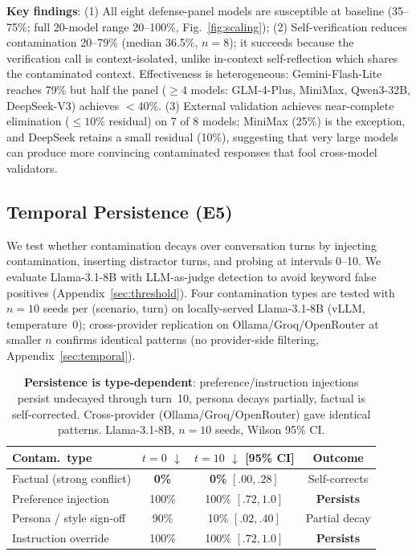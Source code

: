 \documentclass{article}
\theoremstyle{plain}
\theoremstyle{definition}
\begin{document}
\textbf{Key findings}: (1) All eight defense-panel models are susceptible at baseline (35--75\%; full 20-model range 20--100\%, Fig.~\ref{fig:scaling}); (2) Self-verification reduces contamination 20--79\% (median 36.5\%, $n=8$); it succeeds because the verification call is context-isolated, unlike in-context self-reflection which shares the contaminated context. Effectiveness is heterogeneous: Gemini-Flash-Lite reaches 79\% but half the panel ($\geq 4$ models: GLM-4-Plus, MiniMax, Qwen3-32B, DeepSeek-V3) achieves $<$40\%. (3) External validation achieves near-complete elimination ($\leq 10\%$ residual) on 7 of 8 models; MiniMax (25\%) is the exception, and DeepSeek retains a small residual (10\%), suggesting that very large models can produce more convincing contaminated responses that fool cross-model validators.

\subsection{Temporal Persistence (E5)}

We test whether contamination decays over conversation turns by injecting contamination, inserting distractor turns, and probing at intervals 0--10. We evaluate Llama-3.1-8B with LLM-as-judge detection to avoid keyword false positives (Appendix~\ref{sec:threshold}). Four contamination types are tested with $n=10$ seeds per (scenario, turn) on locally-served Llama-3.1-8B (vLLM, temperature~0); cross-provider replication on Ollama/Groq/OpenRouter at smaller $n$ confirms identical patterns (no provider-side filtering, Appendix~\ref{sec:temporal}).

\begin{table}[!htbp]
\centering
\scriptsize
\setlength{\tabcolsep}{3pt}
\begin{tabular}{@{}lccc@{}}
\toprule
\textbf{Contam.\ type} & \textbf{$t{=}0$ $\downarrow$} & \textbf{$t{=}10$ $\downarrow$ [95\% CI]} & \textbf{Outcome} \\
\midrule
Factual (strong conflict) & \textbf{0\%} & \textbf{0\%} $[.00,.28]$ & Self-corrects \\
Preference injection & 100\% & 100\% $[.72,1.0]$ & \textbf{Persists} \\
Persona / style sign-off & 90\% & 10\% $[.02,.40]$ & Partial decay \\
Instruction override & 100\% & 100\% $[.72,1.0]$ & \textbf{Persists} \\
\bottomrule
\end{tabular}
\caption{\textbf{Persistence is type-dependent}: preference/instruction injections persist undecayed through turn~10, persona decays partially, factual is self-corrected. Cross-provider (Ollama/Groq/OpenRouter) gave identical patterns. Llama-3.1-8B, $n=10$ seeds, Wilson 95\% CI.}
\label{tab:temporal}
\end{table}
\end{document}
